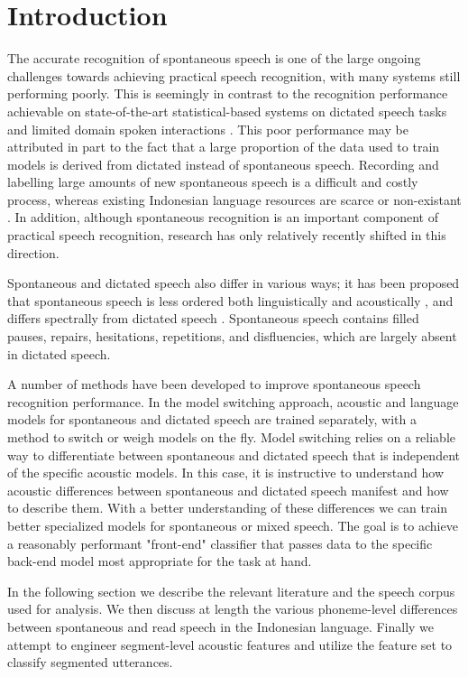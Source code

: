 \documentclass[conference]{IEEEtran}
\begin{document}
\IEEEpeerreviewmaketitle

\section{Introduction}
The accurate recognition of spontaneous speech is one of the large ongoing challenges towards achieving practical speech recognition, with many systems still performing poorly.
This is seemingly in contrast to the recognition performance achievable on state-of-the-art statistical-based systems on dictated speech tasks and limited domain spoken interactions \cite{furui2}.
This poor performance may be attributed in part to the fact that a large proportion of the data used to train models is derived from dictated instead of spontaneous speech.
Recording and labelling large amounts of new spontaneous speech is a difficult and costly process, whereas existing Indonesian language resources are scarce or non-existant \cite{hoesen}.
In addition, although spontaneous recognition is an important component of practical speech recognition, research has only relatively recently shifted in this direction.

Spontaneous and dictated speech also differ in various ways; it has been proposed that spontaneous speech is less ordered both linguistically and acoustically \cite{furui2}, and differs spectrally from dictated speech \cite{nakamura}.
Spontaneous speech contains filled pauses, repairs, hesitations, repetitions, and disfluencies, which are largely absent in dictated speech.

A number of methods have been developed to improve spontaneous speech recognition performance.
In the model switching approach, acoustic and language models for spontaneous and dictated speech are trained separately, with a method to switch or weigh models on the fly.
Model switching relies on a reliable way to differentiate between spontaneous and dictated speech that is independent of the specific acoustic models.
In this case, it is instructive to understand how acoustic differences between spontaneous and dictated speech manifest and how to describe them.
With a better understanding of these differences we can train better specialized models for spontaneous or mixed speech.
The goal is to achieve a reasonably performant "front-end" classifier that passes data to the specific back-end model most appropriate for the task at hand.

In the following section we describe the relevant literature and the speech corpus used for analysis.
We then discuss at length the various phoneme-level differences between spontaneous and read speech in the Indonesian language.
Finally we attempt to engineer segment-level acoustic features and utilize the feature set to classify segmented utterances.
\end{document}
